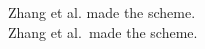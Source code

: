 \documentclass{book}
\begin{document}
\noindent
Zhang et al. made the scheme.\\
Zhang et al.\ made the scheme.
\end{document}
